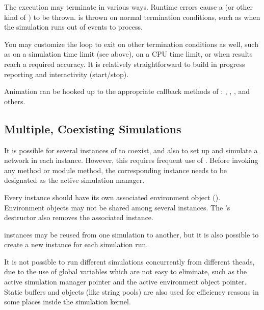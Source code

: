 The execution may terminate in various ways. Runtime errors cause a
 (or other kind of ) to be
thrown.  is thrown on normal termination
conditions, such as when the simulation runs out of events to process.

You may customize the loop to exit on other termination conditions as well,
such as on a simulation time limit (see above), on a CPU time limit, or when
results reach a required accuracy. It is relatively straightforward to
build in progress reporting and interactivity (start/stop).

Animation can be hooked up to the appropriate callback methods of
: , , ,
and others.


\subsection{Multiple, Coexisting Simulations}
\label{sec:embedding:multiple-coexisting-simulations}

It is possible for several instances of  to coexist,
and also to set up and simulate a network in each instance. However, this
requires frequent use of .
Before invoking any  method or module method,
the corresponding  instance needs to be designated
as the active simulation manager.

Every  instance should have its own associated
environment object (). Environment objects may not be
shared among several  instances. The
's destructor also removes the associated
 instance.

 instances may be reused from one simulation to another,
but it is also possible to create a new instance for each simulation run.

\begin{note}
It is not possible to run different simulations concurrently from
different theads, due to the use of global variables which are not easy
to eliminate, such as the active simulation manager pointer and the active
environment object pointer. Static buffers and objects (like string pools)
are also used for efficiency reasons in some places inside the simulation
kernel.
\end{note}



